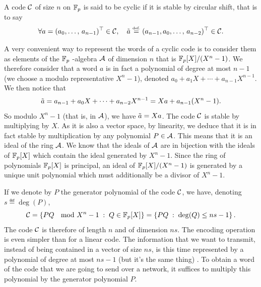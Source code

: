 \begin{defn}
 A code $ \mathcal{C} $ of size $ n $ on $ \mathbb{F}_p $ is said to be cyclic if it is stable by circular shift, that is to say
\begin{equation*}
\forall a = (a_0, \ldots, \, a_{n-1})^\top \in \mathcal{C}, \quad \tilde{a} \stackrel{\mbox{\upshape\tiny def.}}{=} (a_{n-1}, a_0, \ldots, \, a_{n-2})^\top \in \mathcal{C}.
\end{equation*}
\end{defn}
A very convenient way to represent the words of a cyclic code is to consider them as elements of the $ \mathbb{F}_p $ -algebra $ \mathcal{A} $ of dimension $ n $ that is $ \mathbb{F}_p [X] / (X^n-1) $. We therefore consider that a word $ a $ is in fact a polynomial of degree at most $ n-1 $ (we choose a modulo representative $ X^n-1 $), denoted $ a_0 + a_1 X + \cdots + a_{n-1} X^{n-1} $. We then notice that
\begin{equation*}
\tilde{a} = a_{n-1} + a_0 X + \cdots + a_{n-2} X^{n-1} = X a + a_{n-1} (X^n - 1).
\end{equation*}
 So modulo $ X^n-1 $ (that is, in $ \mathcal{A} $), we have $ \tilde{a} = X a $. The code $ \mathcal{C} $ is stable by multiplying by $ X $. As it is also a vector space, by linearity, we deduce that it is in fact stable by multiplication by any polynomial $ P \in \mathcal{A} $. This means that it is an ideal of the ring $ \mathcal{A} $. We know that the ideals of $ \mathcal{A} $ are in bijection with the ideals of $ \mathbb{F}_p [X] $ which contain the ideal generated by $ X^n-1 $. Since the ring of polynomials $ \mathbb{F}_p [X] $ is principal, an ideal of $ \mathbb{F}_p [X] / (X^n-1) $ is generated by a unique unit polynomial which must additionally be a divisor of $ X^n-1 $.
 
 
 If we denote by $ P $ the generator polynomial of the code $ \mathcal{C} $, we have, denoting $ s \eqdef \deg (P) $,
\begin{equation*}
\mathcal{C} = \left\{ PQ \; \mod{X^n-1} \;:\; Q \in \mathbb{F}_p [X] \right\} = \left\{ PQ \;:\; \deg (Q) \leq ns-1 \right\}.
\end{equation*}
The code $ \mathcal{C} $ is therefore of length $ n $ and of dimension $ ns $. The encoding operation is even simpler than for a linear code. The information that we want to transmit, instead of being contained in a vector of size $ ns $, is this time represented by a polynomial of degree at most $ ns-1 $ (but it's the same thing) . To obtain a word of the code that we are going to send over a network, it suffices to multiply this polynomial by the generator polynomial $ P $.
 
